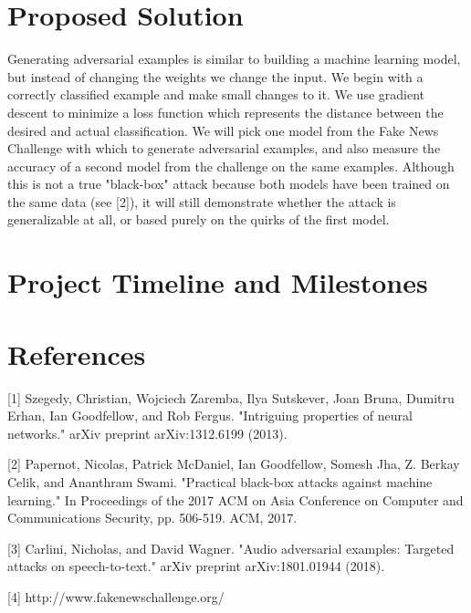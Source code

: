 \documentclass{article}
\begin{document}
\section{Proposed Solution}
\label{how}
Generating adversarial examples is similar to building a machine learning model, but instead of changing the weights we change the input. We begin with a correctly classified example and make small changes to it. We use gradient descent to minimize a loss function which represents the distance between the desired and actual classification. We will pick one model from the Fake News Challenge with which to generate adversarial examples, and also measure the accuracy of a second model from the challenge on the same examples. Although this is not a true "black-box" attack because both models have been trained on the same data (see [2]), it will still demonstrate whether the attack is generalizable at all, or based purely on the quirks of the first model.

\section{Project Timeline and Milestones}
\label{when}

\section*{References}
\medskip

\small

[1] Szegedy, Christian, Wojciech Zaremba, Ilya Sutskever, Joan Bruna, Dumitru Erhan, Ian Goodfellow, and Rob Fergus. "Intriguing properties of neural networks." arXiv preprint arXiv:1312.6199 (2013).

[2] Papernot, Nicolas, Patrick McDaniel, Ian Goodfellow, Somesh Jha, Z. Berkay Celik, and Ananthram Swami. "Practical black-box attacks against machine learning." In Proceedings of the 2017 ACM on Asia Conference on Computer and Communications Security, pp. 506-519. ACM, 2017.

[3] Carlini, Nicholas, and David Wagner. "Audio adversarial examples: Targeted attacks on speech-to-text." arXiv preprint arXiv:1801.01944 (2018).

[4] http://www.fakenewschallenge.org/
\end{document}
